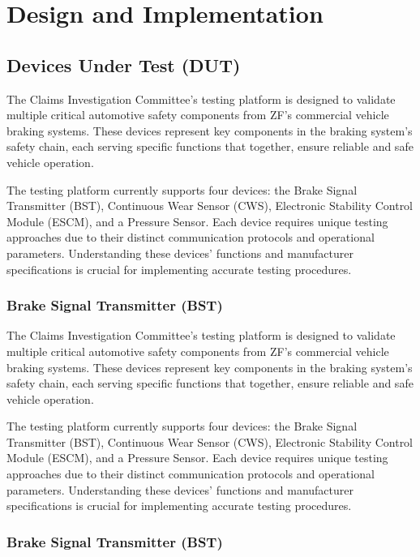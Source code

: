 \documentclass[12pt]{article}
\begin{document}
\section{Design and Implementation}

\subsection{Devices Under Test (DUT)}
The Claims Investigation Committee's testing platform is designed to validate
multiple critical automotive safety components from ZF's commercial vehicle
braking systems. These devices represent key components in the braking system's
safety chain, each serving specific functions that together, ensure reliable
and safe vehicle operation.

The testing platform currently supports four devices: the Brake Signal
Transmitter (BST), Continuous Wear Sensor (CWS), Electronic Stability Control
Module (ESCM), and a Pressure Sensor. Each device requires unique testing
approaches due to their distinct communication protocols and operational
parameters. Understanding these devices' functions and manufacturer
specifications is crucial for implementing accurate testing procedures. 


\subsubsection{Brake Signal Transmitter (BST)}
The Claims Investigation Committee's testing platform is designed to validate
multiple critical automotive safety components from ZF's commercial vehicle
braking systems. These devices represent key components in the braking system's
safety chain, each serving specific functions that together, ensure reliable
and safe vehicle operation.

The testing platform currently supports four devices: the Brake Signal
Transmitter (BST), Continuous Wear Sensor (CWS), Electronic Stability Control
Module (ESCM), and a Pressure Sensor. Each device requires unique testing
approaches due to their distinct communication protocols and operational
parameters. Understanding these devices' functions and manufacturer
specifications is crucial for implementing accurate testing procedures. 

\subsubsection{Brake Signal Transmitter (BST)}
\end{document}

